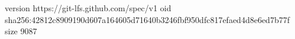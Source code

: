 version https://git-lfs.github.com/spec/v1
oid sha256:42812c8909190d607a164605d71640b3246fbf950dfc817efaed4d8e6ed7b77f
size 9087
